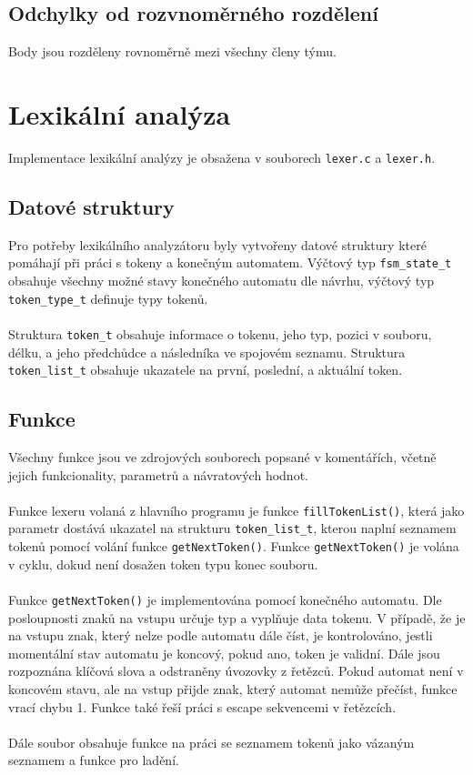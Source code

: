 \documentclass[11pt,a4paper]{article}
\begin{document}
\subsection{Odchylky od rozvnoměrného rozdělení}
Body jsou rozděleny rovnoměrně mezi všechny členy týmu.

\pagebreak{}

\section{Lexikální analýza}

Implementace lexikální analýzy je obsažena v souborech \verb|lexer.c| a \verb|lexer.h|.

\subsection{Datové struktury}
Pro potřeby lexikálního analyzátoru byly vytvořeny datové struktury které pomáhají při
práci s tokeny a konečným automatem. Výčtový typ \verb|fsm_state_t| obsahuje všechny možné
stavy konečného automatu dle návrhu, výčtový typ \verb|token_type_t| definuje typy tokenů.
\\ \\
Struktura \verb|token_t| obsahuje informace o tokenu, jeho typ, pozici v souboru, délku,
a jeho předchůdce a následníka ve spojovém seznamu. Struktura \verb|token_list_t| obsahuje
ukazatele na první, poslední, a aktuální token.

\subsection{Funkce}

Všechny funkce jsou ve zdrojových souborech popsané v komentářích, včetně jejich funkcionality, parametrů a návratových hodnot.
\\ \\
Funkce lexeru volaná z hlavního programu je funkce \verb|fillTokenList()|, která jako parametr
dostává ukazatel na strukturu \verb|token_list_t|, kterou naplní seznamem tokenů pomocí volání
funkce \verb|getNextToken()|. Funkce \verb|getNextToken()| je volána v cyklu, dokud není dosažen token
typu konec souboru.
\\ \\
Funkce \verb|getNextToken()| je implementována pomocí konečného automatu. Dle posloupnosti znaků na vstupu
určuje typ a vyplňuje data tokenu. V případě, že je na vstupu znak, který nelze podle automatu dále číst,
je kontrolováno, jestli momentální stav automatu je koncový, pokud ano, token je validní.
Dále jsou rozpoznána klíčová slova a odstraněny úvozovky z řetězců. Pokud automat není v koncovém stavu,
ale na vstup přijde znak, který automat nemůže přečíst, funkce vrací chybu 1. Funkce také řeší práci s escape
sekvencemi v řetězcích.
\\ \\
Dále soubor obsahuje funkce na práci se seznamem tokenů jako vázaným seznamem a funkce pro ladění.
\end{document}
